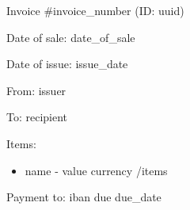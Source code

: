 \documentclass{article}
\begin{document}
  Invoice \#{{invoice_number}} (ID: {{uuid}})

  Date of sale: {{date_of_sale}}

  Date of issue: {{issue_date}}

  From:
  {{issuer}}

  To:
  {{recipient}}

  Items:
  \begin{itemize}
    {{#items}}
    \item{ {{name}} - {{value}} {{currency}} }
    {{/items}}
  \end{itemize}

  Payment to: {{iban}} due {{due_date}}
\end{document}
